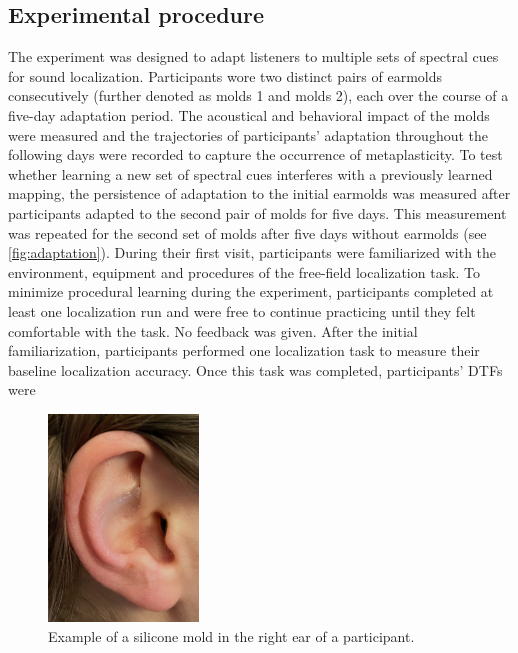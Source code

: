\subsection{Experimental procedure}
The experiment was designed to adapt listeners to multiple sets of spectral cues for sound localization. Participants wore two distinct pairs of earmolds consecutively (further denoted as molds 1 and molds 2), each over the course of a five-day adaptation period. The acoustical and behavioral impact of the molds were measured and the trajectories of participants’ adaptation throughout the following days were recorded to capture the occurrence of metaplasticity. To test whether learning a new set of spectral cues interferes with a previously learned mapping, the persistence of adaptation to the initial earmolds was measured after participants adapted to the second pair of molds for five days. This measurement was repeated for the second set of molds after five days without earmolds (see \cref{fig:adaptation}). During their first visit, participants were familiarized with the environment, equipment and procedures of the free-field localization task. To minimize procedural learning during the experiment, participants completed at least one localization run and were free to continue practicing until they felt comfortable with the task. No feedback was given. After the initial familiarization, participants performed one localization task to measure their baseline localization accuracy. Once this task was completed, participants’ DTFs were \newpage
\begin{figure}
\includegraphics[width=4cm]{../Results/figures/earmold/mold}
\caption{Example of a silicone mold in the right ear of a participant.}
\label{fig:earmold}
\end{figure}
\noindent\vspace{0\baselineskip}
